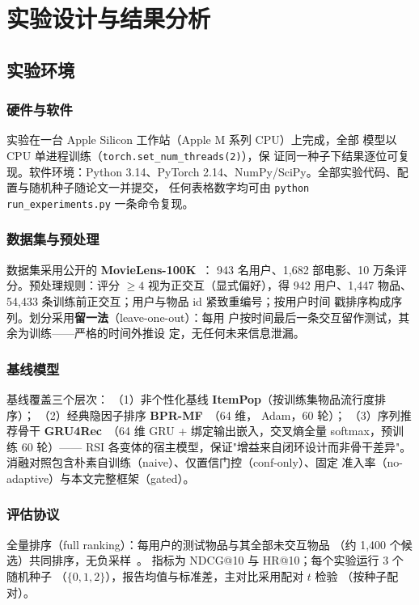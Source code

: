 \chapter{实验设计与结果分析}\label{ch:exp}

\section{实验环境}
\subsection{硬件与软件}
实验在一台 Apple Silicon 工作站（Apple M 系列 CPU）上完成，全部
模型以 CPU 单进程训练（\texttt{torch.set\_num\_threads(2)}），保
证同一种子下结果逐位可复现。软件环境：Python 3.14、PyTorch
2.14、NumPy/SciPy。全部实验代码、配置与随机种子随论文一并提交，
任何表格数字均可由
\texttt{python run\_experiments.py} 一条命令复现。

\subsection{数据集与预处理}
数据集采用公开的 \textbf{MovieLens-100K}~\cite{harper2015ml}：
943 名用户、1{,}682 部电影、10 万条评分。预处理规则：评分
$\geq 4$ 视为正交互（显式偏好），得 942 用户、1{,}447 物品、
54{,}433 条训练前正交互；用户与物品 id 紧致重编号；按用户时间
戳排序构成序列。划分采用\textbf{留一法}（leave-one-out）：每用
户按时间最后一条交互留作测试，其余为训练——严格的时间外推设
定，无任何未来信息泄漏。

\subsection{基线模型}
基线覆盖三个层次：
（1）非个性化基线 \textbf{ItemPop}（按训练集物品流行度排序）；
（2）经典隐因子排序 \textbf{BPR-MF}~\cite{rendle2009bpr}（64 维，
Adam，60 轮）；
（3）序列推荐骨干 \textbf{GRU4Rec}~\cite{hidasi2016gru4rec}（64
维 GRU + 绑定输出嵌入，交叉熵全量 softmax，预训练 60 轮）——
RSI 各变体的宿主模型，保证"增益来自闭环设计而非骨干差异"。
消融对照包含朴素自训练（naive）、仅置信门控（conf-only）、固定
准入率（no-adaptive）与本文完整框架（gated）。

\subsection{评估协议}
全量排序（full ranking）：每用户的测试物品与其全部未交互物品
（约 1{,}400 个候选）共同排序，无负采样~\cite{dacrema2019worrying}。
指标为 NDCG@10 与 HR@10；每个实验运行 3 个随机种子
（$\{0,1,2\}$），报告均值与标准差，主对比采用配对 $t$ 检验
（按种子配对）。


